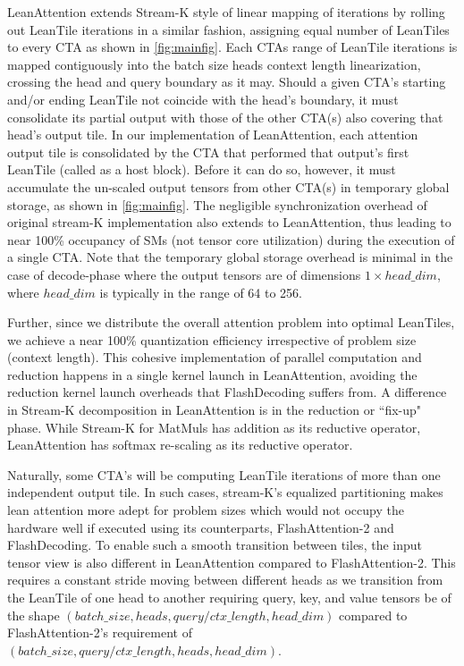 LeanAttention extends Stream-K style of linear mapping of iterations by rolling out LeanTile iterations in a similar fashion, assigning equal number of LeanTiles to every CTA as shown in \autoref{fig:mainfig}. Each CTAs range of LeanTile iterations is mapped contiguously into the batch size \textrightarrow heads \textrightarrow context length linearization, crossing the head and query boundary as it may. Should a given CTA's starting and/or ending LeanTile not coincide with the head's boundary, it must consolidate its partial output with those of the other CTA(s) also covering that head's output tile. In our implementation of LeanAttention, each attention output tile is consolidated by the CTA that performed that output's first LeanTile (called as a host block). Before it can do so, however, it must accumulate the un-scaled output tensors from other CTA(s) in temporary global storage, as shown in \autoref{fig:mainfig}. The negligible synchronization overhead of original stream-K implementation also extends to LeanAttention, thus leading to near 100\% occupancy of SMs (not tensor core utilization) during the execution of a single CTA. Note that the temporary global storage overhead is minimal in the case of decode-phase where the output tensors are of dimensions $1 \times head\_dim$, where $head\_dim$ is typically in the range of 64 to 256.

Further, since we distribute the overall attention problem into optimal LeanTiles, we achieve a near 100\% quantization efficiency irrespective of problem size (context length). This cohesive implementation of parallel computation and reduction happens in a single kernel launch in LeanAttention, avoiding the reduction kernel launch overheads that FlashDecoding suffers from. A difference in Stream-K decomposition in LeanAttention is in the reduction or ``fix-up" phase. While Stream-K for MatMuls has addition as its reductive operator, LeanAttention has softmax re-scaling as its reductive operator.

Naturally, some CTA's will be computing LeanTile iterations of more than one independent output tile. In such cases, stream-K's equalized partitioning makes lean attention more adept for problem sizes which would not occupy the hardware well if executed using its counterparts, FlashAttention-2 and FlashDecoding. To enable such a smooth transition between tiles, the input tensor view is also different in LeanAttention compared to FlashAttention-2. This requires a constant stride moving between different heads as we transition from the LeanTile of one head to another requiring query, key, and value tensors be of the shape $(batch\_size, heads, query/ctx\_length, head\_dim)$ compared to FlashAttention-2's requirement of $(batch\_size, query/ctx\_length, heads, head\_dim)$.

